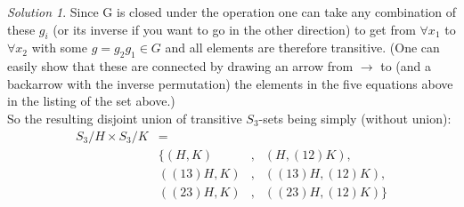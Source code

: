 \documentclass[a4paper,twoside=false,abstract=false,numbers=noenddot,
titlepage=false,headings=small,parskip=half,version=last]{scrartcl}
\theoremstyle{definition}
\theoremstyle{remark}
\newtheorem*{solution}{Solution}
\begin{document}
\begin{solution}
Since G is closed under the operation one can take any combination of these
$g_i$ (or its inverse if you want to go in the other direction) to get from
$\forall x_1$ to $\forall x_2$ with some $g=g_2g_1 \in G$ and 
all elements are therefore transitive. (One can easily show that these are
connected by drawing an arrow from $\rightarrow$ to (and a backarrow with the
inverse permutation) the elements in the five equations above in the 
listing of the set above.)\\

So the resulting disjoint union of transitive $S_3$-sets being simply (without
union):\\
\begin{align*}
    S_3/H \times S_3/K  &=        & &\\
                        &\{  (H,K)&,& (    H,(12)K), \\
                        &((13)H,K)&,& ((13)H,(12)K), \\
                        &((23)H,K)&,& ((23)H,(12)K)\}
\end{align*}



\end{solution}

\end{document}
